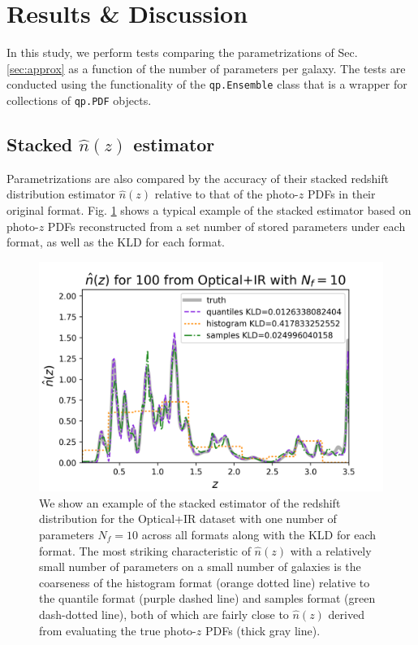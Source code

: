 \documentclass[\docopts]{\docclass}
\newcommand{\pz}{photo-$z$ PDF}
\begin{document}
\section{Results \& Discussion}
\label{sec:results}


In this study, we perform tests comparing the parametrizations of Sec. 
\ref{sec:approx} as a function of the number of parameters per galaxy.  The 
tests are conducted using the functionality of the \texttt{qp.Ensemble} class 
that is a wrapper for collections of \texttt{qp.PDF} objects.


\subsection{Stacked $\hat{n}(z)$ estimator}
\label{sec:stacked_results}

Parametrizations are also compared by the accuracy of their stacked redshift 
distribution estimator $\hat{n}(z)$ relative to that of the \pz s in their 
original format.  Fig. \ref{fig:stacked} shows a typical example of the stacked 
estimator based on \pz s reconstructed from a set number of stored parameters 
under each format, as well as the KLD for each format.

\begin{figure}
  \includegraphics[width=0.9\columnwidth]{figures/euclid_stacked.png}
  \caption{We show an example of the stacked estimator of the redshift 
distribution for the Optical+IR dataset with one number of parameters 
$N_{f}=10$ across all formats along with the KLD for each format.  The most 
striking characteristic of $\hat{n}(z)$ with a relatively small number of 
parameters on a small number of galaxies is the coarseness of the histogram 
format (orange dotted line) relative to the quantile format (purple dashed 
line) and samples format (green dash-dotted line), both of which are fairly 
close to $\hat{n}(z)$ derived from evaluating the true \pz s (thick gray line).
  \label{fig:stacked}}
\end{figure}
\end{document}

